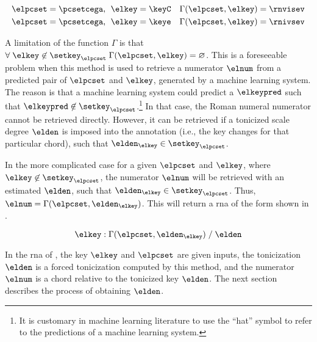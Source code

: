 \begin{equation}
    \label{eq:numerator_from_pcset_key}
    \begin{split}
        \elpcset = \pcsetcega \text{, } \; \elkey = \keyC \quad \Gamma(\elpcset, \elkey) = \rnvisev \\
        \elpcset = \pcsetcega \text{, } \; \elkey = \keye \quad \Gamma(\elpcset, \elkey) = \rnivsev \\
    \end{split}
\end{equation}


A limitation of the function $\Gamma$ is that $\forall \;
\elkey \not\in \setkey_\elpcset \; \Gamma(\elpcset, \elkey)
= \varnothing$. This is a foreseeable problem when this
method is used to retrieve a numerator $\elnum$ from a
predicted pair of $\elpcset$ and $\elkey$, generated by a
machine learning system. The reason is that a machine
learning system could predict a $\elkeypred$ such that
$\elkeypred \not\in \setkey_\elpcset$.\footnote{It is
customary in machine learning literature to use the ``hat''
symbol to refer to the predictions of a machine learning
system.} In that case, the Roman numeral numerator cannot be
retrieved directly. However, it can be retrieved if a
tonicized scale degree $\elden$ is imposed into the
annotation (i.e., the key changes for that particular
chord), such that $\elden_{\elkey} \in \setkey_\elpcset$.

In the more complicated case for a given $\elpcset$ and
$\elkey$, where $\elkey \not\in \setkey_\elpcset$, the
numerator $\elnum$ will be retrieved with an estimated
$\elden$, such that $\elden_{\elkey} \in \setkey_\elpcset$.
Thus, $\elnum = \Gamma(\elpcset, \elden_{\elkey})$. This
will return a \gls{rna} of the form shown in
.

\begin{equation}
    \label{eq:numerator_from_pcset_den}
    \elkey \; \text{:} \; \Gamma(\elpcset, \elden_{\elkey}) \; \text{/} \; \elden
\end{equation}

In the \gls{rna} of , the
key $\elkey$ and $\elpcset$ are given inputs, the
tonicization $\elden$ is a forced tonicization computed by
this method, and the numerator $\elnum$ is a chord relative
to the tonicized key $\elden$. The next section describes
the process of obtaining $\elden$.
